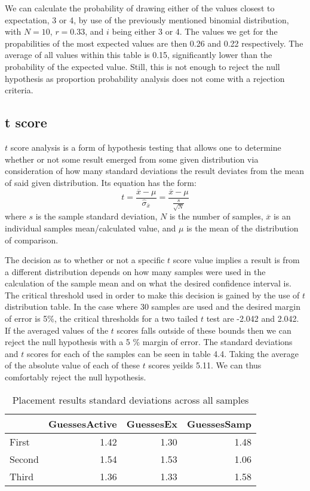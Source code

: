 We can calculate the probability of drawing either of the values closest
to expectation, 3 or 4, by use of the previously mentioned binomial distribution,
with $N = 10$, $r = 0.33$, and $i$ being either 3 or 4. The values we get for
the propabilities of the most expected values are then 0.26 and 0.22
respectively. The average of all values within this table is
0.15, significantly lower than the probability of the expected value.
Still, this is not enough to reject the null hypothesis as proportion
probability analysis does not come with a rejection criteria.

\subsection{t score}
$t$ score analysis is a form of hypothesis testing that allows one to determine
whether or not some result emerged from some given distribution via consideration
of how many standard deviations the result deviates from the mean of said given
distribution. Its equation has the form:
$$t =\frac{\overline{x}-\mu}{\hat{\sigma}_{\overline{x}}} = \frac{\overline{x}-\mu}{\frac{s}{\sqrt{N}}}$$
where $s$ is the sample standard deviation, $N$ is the number of samples,
$\overline{x}$ is an individual samples mean/calculated value, and $\mu$ is
the mean of the distribution of comparison.

The decision as to whether or not a specific $t$ score value implies a result
is from a different distribution depends on how many samples were used in the
calculation of the sample mean and on what the desired confidence interval is.
The critical threshold used in order to make this decision is gained by the use
of $t$ distribution table. In the case where 30 samples are used and the desired
margin of error is 5\%, the critical thresholds for a two tailed $t$ test are
-2.042 and 2.042. If the averaged values of the $t$ scores falls outside of
these bounds then we can reject the null hypothesis with a 5 \% margin of error.
The standard deviations and $t$ scores for each of the samples can be seen in
table 4.4. Taking the average of the absolute value of each of these $t$ scores
yeilds 5.11. We can thus comfortably reject the null hypothesis.


\begin{table}
\begin{tabular}{lrrr}
\toprule
{} &  GuessesActive &  GuessesEx &  GuessesSamp \\
\midrule
First  &           1.42 &       1.30 &     1.48 \\
Second &           1.54 &       1.53 &     1.06 \\
Third  &           1.36 &       1.33 &     1.58 \\
\bottomrule
\end{tabular}
\caption{Placement results standard deviations across all samples}
\end{table}


